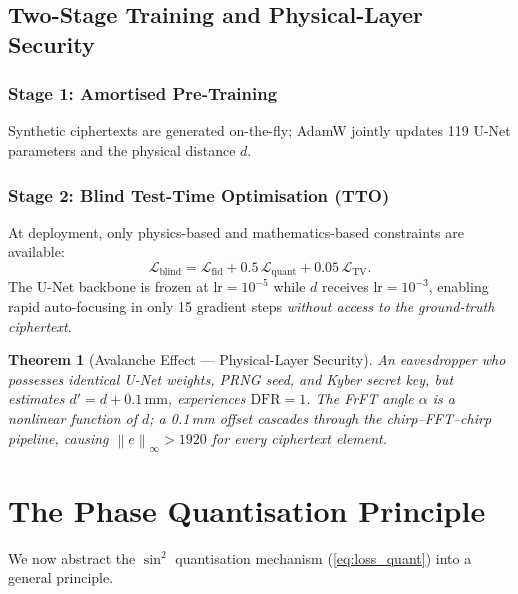 \documentclass[11pt, a4paper]{article}
\theoremstyle{definition}
\theoremstyle{plain}
\newtheorem{theorem}{Theorem}[section]
\newcommand{\norm}[1]{\left\|#1\right\|}
\begin{document}
\subsection{Two-Stage Training and Physical-Layer Security}
\label{sec:training}

\subsubsection{Stage 1: Amortised Pre-Training}
Synthetic ciphertexts are generated on-the-fly; AdamW jointly updates
119 U-Net parameters and the physical distance $d$.

\subsubsection{Stage 2: Blind Test-Time Optimisation (TTO)}
At deployment, only physics-based and mathematics-based constraints are
available:
\begin{equation}
  \mathcal{L}_{\text{blind}} =
  \mathcal{L}_{\text{fid}} + 0.5\,\mathcal{L}_{\text{quant}} +
  0.05\,\mathcal{L}_{\text{TV}}.
  \label{eq:blind_loss}
\end{equation}
The U-Net backbone is frozen at $\mathrm{lr} = 10^{-5}$ while
$d$ receives $\mathrm{lr} = 10^{-3}$, enabling rapid auto-focusing
in only 15 gradient steps \textit{without access to the ground-truth
ciphertext}.

\begin{theorem}[Avalanche Effect --- Physical-Layer Security]
\label{thm:avalanche}
An eavesdropper who possesses identical U-Net weights, PRNG seed, and
Kyber secret key, but estimates $d' = d + 0.1\,\mathrm{mm}$, experiences
$\mathrm{DFR} = 1$. The FrFT angle $\alpha$ is a nonlinear function of
$d$; a 0.1\,mm offset cascades through the chirp--FFT--chirp pipeline,
causing $\norm{e}_\infty > 1920$ for every ciphertext element.
\end{theorem}


\section{The Phase Quantisation Principle}
\label{sec:bridge}

We now abstract the $\sin^2$ quantisation mechanism
(\cref{eq:loss_quant}) into a general principle.
\end{document}
